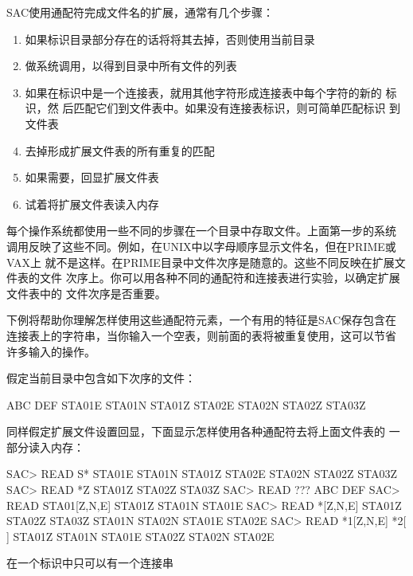 SAC使用通配符完成文件名的扩展，通常有几个步骤：
\begin{enumerate}
\item 如果标识目录部分存在的话将将其去掉，否则使用当前目录
\item 做系统调用，以得到目录中所有文件的列表
\item 如果在标识中是一个连接表，就用其他字符形成连接表中每个字符的新的
    标识，然 后匹配它们到文件表中。如果没有连接表标识，则可简单匹配标识
    到文件表
\item 去掉形成扩展文件表的所有重复的匹配
\item 如果需要，回显扩展文件表
\item 试着将扩展文件表读入内存
\end{enumerate}

每个操作系统都使用一些不同的步骤在一个目录中存取文件。上面第一步的系统
调用反映了这些不同。例如，在UNIX中以字母顺序显示文件名，但在PRIME或VAX上
就不是这样。在PRIME目录中文件次序是随意的。这些不同反映在扩展文件表的文件
次序上。你可以用各种不同的通配符和连接表进行实验，以确定扩展文件表中的
文件次序是否重要。

下例将帮助你理解怎样使用这些通配符元素，一个有用的特征是SAC保存包含在
连接表上的字符串，当你输入一个空表，则前面的表将被重复使用，这可以节省
许多输入的操作。

假定当前目录中包含如下次序的文件：
\begin{SACCode}
ABC DEF STA01E STA01N STA01Z STA02E STA02N STA02Z STA03Z
\end{SACCode}

同样假定扩展文件设置回显，下面显示怎样使用各种通配符去将上面文件表的
一部分读入内存：
\begin{SACCode}
SAC> READ S*
 STA01E STA01N STA01Z STA02E STA02N STA02Z STA03Z
SAC> READ *Z
 STA01Z STA02Z STA03Z
SAC> READ ???
 ABC DEF
SAC> READ STA01[Z,N,E]
 STA01Z STA01N STA01E
SAC> READ *[Z,N,E]
 STA01Z STA02Z STA03Z STA01N STA02N STA01E STA02E
SAC> READ *1[Z,N,E] *2[ ]
 STA01Z STA01N STA01E STA02Z STA02N STA02E
\end{SACCode}

在一个标识中只可以有一个连接串
